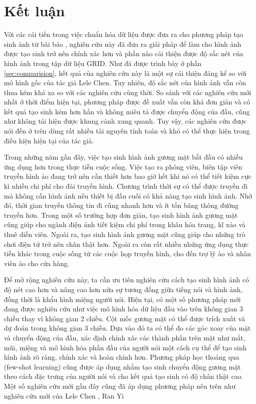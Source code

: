 \chapter{Kết luận}

Với các cải tiến trong việc chuẩn hóa dữ liệu được đưa ra cho phương pháp tạo sinh ảnh từ bài báo \cite{chen2019}, nghiên cứu này đã đưa ra giải pháp để làm cho hình ảnh được tạo sinh trở nên chính xác hơn và phần nào cải thiện được độ sắc nét của hình ảnh trong tập dữ liệu GRID. Như đã được trình bày ở phần \ref{sec:comparision}, kết quả của nghiên cứu này là một sự cải thiện đáng kể so với mô hình gốc của tác giả Lele Chen. Tuy nhiên, độ sắc nét của hình ảnh vẫn còn thua kém khá xa so với các nghiên cứu cùng thời. So sánh với các nghiên cứu mới nhất ở thời điểm hiện tại, phương pháp được đề xuất vẫn còn khá đơn giản và có kết quả tạo sinh kém hơn hẳn và không miêu tả được chuyển động của đầu, cũng như không tái hiện được khung cảnh xung quanh. Tuy vậy, các nghiên cứu được nói đến ở trên dùng rất nhiều tài nguyên tính toán và khó có thể thực hiện trong điều kiện hiện tại của tác giả.

Trong những năm gần đây, việc tạo sinh hình ảnh gương mặt bắt đầu có nhiều ứng dụng hơn trong thực tiễn cuộc sống. Việc tạo ra phóng viên, biên tập viên truyền hình ảo đang trở nên cần thiết hơn bao giờ hết khi nó có thể tiết kiệm cực kì nhiều chi phí cho đài truyền hình. Chương trình thời sự có thể được truyền đi mà không cần hình ảnh nếu thiết bị đầu cuối có khả năng tạo sinh hình ảnh. Nhờ đó, thời gian truyền thông tin đi cũng nhanh hơn và ít tốn băng thông đường truyền hơn. Trong một số trường hợp đơn giản, tạo sinh hình ảnh gương mặt cũng giúp cho ngành điện ảnh tiết kiệm chi phí trong khâu hóa trang, kĩ xảo và thuê diễn viên. Ngoài ra, tạo sinh hình ảnh gương mặt cũng giúp cho những trò chơi điện tử trở nên chân thật hơn. Ngoài ra còn rất nhiều những ứng dụng thực tiễn khác trong cuộc sống từ các cuộc họp truyền hình, cho đến trợ lý ảo và nhân viên ảo cho cửa hàng.

Để mở rộng nghiên cứu này, ta cần ưu tiên nghiên cứu cách tạo sinh hình ảnh có độ nét cao hơn và nâng cao hơn nữa sự tương đồng giữa tiếng nói và hình ảnh, đồng thời là khẩu hình miệng người nói. Hiện tại, có một số phương pháp mới đang được nghiên cứu như việc mô hình hóa dữ liệu đầu vào trên không gian 3 chiều thay vì không gian 2 chiều. Cột mốc gương mặt có thể được trích xuất và dự đoán trong không gian 3 chiều. Dựa vào đó ta có thể đo các góc xoay của mặt và chuyển động của đầu, xác định chính xác các thành phần trên mặt như mắt, mũi, miệng và mô hình hóa phần đầu của người nói một cách cụ thể để tạo sinh hình ảnh rõ ràng, chính xác và hoàn chỉnh hơn. Phương pháp học thoáng qua (few-shot learning) cũng được áp dụng nhằm tạo sinh chuyển động gương mặt theo cách đặc trưng của người nói và cho kết quả tạo sinh có độ chân thật cao. Một số nghiên cứu mới gần đây cũng đã áp dụng phương pháp nêu trên như nghiên cứu mới của Lele Chen \cite{chen2020}, Ran Yi \cite{ranyi}
